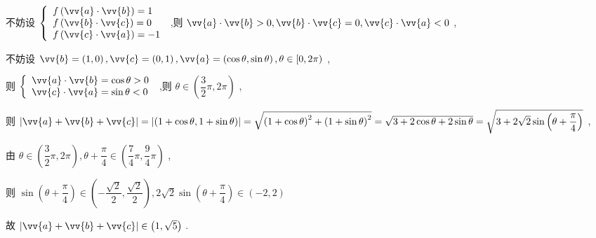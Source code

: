 \begin{enumerate}
\begin{jieda}
        不妨设 $\left\{  \begin{array}{l} f\left( {\vv{a} \cdot  \vv{b}}\right)  = 1 \\  f\left( {\vv{b} \cdot  \vv{c}}\right)  = 0 \\  f\left( {\vv{c} \cdot  \vv{a}}\right)  =  - 1 \end{array}\right.$ ,则 $\vv{a} \cdot  \vv{b} > 0,\vv{b} \cdot  \vv{c} = 0,\vv{c} \cdot  \vv{a} < 0$ ,
        
        不妨设 $\vv{b} = \left( {1,0}\right) ,\vv{c} = \left( {0,1}\right) ,\vv{a} = \left( {\cos \theta ,\sin \theta }\right) ,\theta  \in  \lbrack 0,{2\pi })$ ,
        
        则 $\left\{  \begin{array}{l} \vv{a} \cdot  \vv{b} = \cos \theta  > 0 \\  \vv{c} \cdot  \vv{a} = \sin \theta  < 0 \end{array}\right.$ ,则 $\theta  \in  \left( {\dfrac{3}{2}\pi ,{2\pi }}\right)$ ,
        
        则 $\left| {\vv{a} + \vv{b} + \vv{c}}\right|  = \left| \left( {1 + \cos \theta ,1 + \sin \theta }\right) \right|  = \sqrt{{\left( 1 + \cos \theta \right) }^{2} + {\left( 1 + \sin \theta \right) }^{2}} = \sqrt{3 + 2\cos \theta  + 2\sin \theta }  = \sqrt{3 + 2\sqrt{2}\sin \left( {\theta  + \dfrac{\pi }{4}}\right) }$ ,
        
        由 $\theta  \in  \left( {\dfrac{3}{2}\pi ,{2\pi }}\right) ,\theta  + \dfrac{\pi }{4} \in  \left( {\dfrac{7}{4}\pi ,\dfrac{9}{4}\pi }\right)$ ,
        
        则 $\sin \left( {\theta  + \dfrac{\pi }{4}}\right)  \in  \left( {-\dfrac{\sqrt{2}}{2},\dfrac{\sqrt{2}}{2}}\right) ,2\sqrt{2}\sin \left( {\theta  + \dfrac{\pi }{4}}\right)  \in  \left( {-2,2}\right)$
        
        故 $\left| {\vv{a} + \vv{b} + \vv{c}}\right|  \in  \left( {1,\sqrt{5}}\right)$ .
    \end{jieda}
\end{enumerate}
